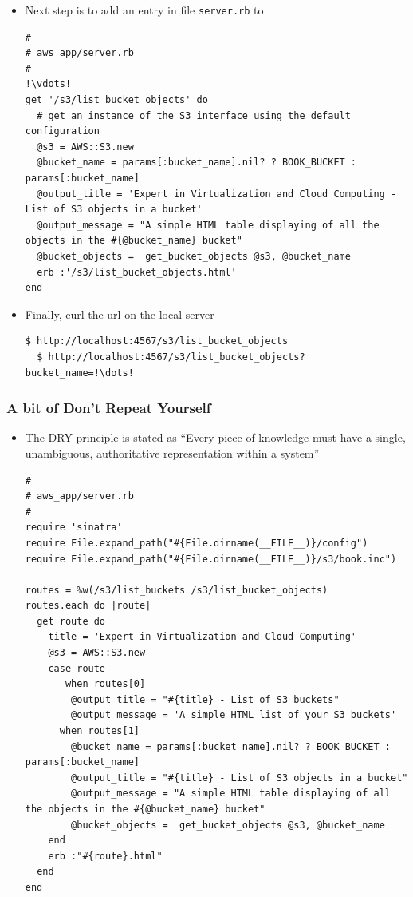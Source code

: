\documentclass{beamer}
\begin{document}
\begin{frame}
\begin{itemize}
\item Next step is to add an entry in file \texttt{server.rb} to
\lstset{language=Ruby, style=eclipse}
\begin{lstlisting}[escapechar=!]
#
# aws_app/server.rb
#
!\vdots!
get '/s3/list_bucket_objects' do
  # get an instance of the S3 interface using the default configuration
  @s3 = AWS::S3.new
  @bucket_name = params[:bucket_name].nil? ? BOOK_BUCKET : params[:bucket_name]
  @output_title = 'Expert in Virtualization and Cloud Computing - List of S3 objects in a bucket'
  @output_message = "A simple HTML table displaying of all the objects in the #{@bucket_name} bucket"
  @bucket_objects =  get_bucket_objects @s3, @bucket_name
  erb :'/s3/list_bucket_objects.html'
end
\end{lstlisting}
\item Finally, curl the url on the local server
\lstset{language=shell}
\begin{lstlisting}[escapechar=!]
  $ http://localhost:4567/s3/list_bucket_objects
  $ http://localhost:4567/s3/list_bucket_objects?bucket_name=!\dots!
\end{lstlisting}

\end{itemize}
\end{frame}

\begin{frame}
\frametitle{A bit of Don't Repeat Yourself}
\begin{itemize}
 \item The DRY principle is stated as ``Every piece of knowledge must have a single, unambiguous, authoritative representation within a system''

\lstset{language=Ruby, style=eclipse}
\begin{lstlisting}[escapechar=!]
#
# aws_app/server.rb
#
require 'sinatra'
require File.expand_path("#{File.dirname(__FILE__)}/config")
require File.expand_path("#{File.dirname(__FILE__)}/s3/book.inc")

routes = %w(/s3/list_buckets /s3/list_bucket_objects)
routes.each do |route|
  get route do
    title = 'Expert in Virtualization and Cloud Computing'
    @s3 = AWS::S3.new
    case route
       when routes[0]
        @output_title = "#{title} - List of S3 buckets"
        @output_message = 'A simple HTML list of your S3 buckets'
      when routes[1]
        @bucket_name = params[:bucket_name].nil? ? BOOK_BUCKET : params[:bucket_name]
        @output_title = "#{title} - List of S3 objects in a bucket"
        @output_message = "A simple HTML table displaying of all the objects in the #{@bucket_name} bucket"
        @bucket_objects =  get_bucket_objects @s3, @bucket_name
    end
    erb :"#{route}.html"
  end
end
\end{lstlisting}
\end{itemize}

\end{frame}
\end{document}
